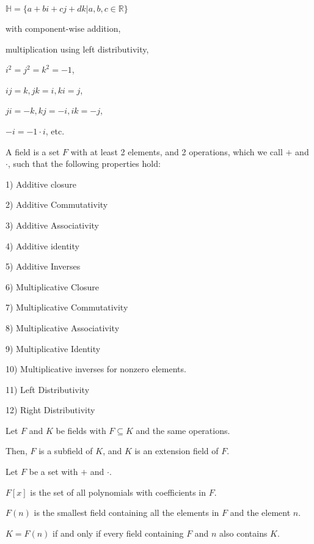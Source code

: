 \documentclass{article}
\newcommand{\R}{\mathbb R}
\newcommand{\quat}{\mathbb H}
\begin{document}

    $\quat = \{a + bi + cj + dk | a,b,c \in\R\}$
    
    with component-wise addition,
    
    multiplication using left distributivity,
    
    $i^2 = j^2 = k^2 = -1$,
    
    $ij = k, jk = i, ki = j$,
    
    $ji = -k, kj = -i, ik = -j$,
    
    $-i = -1 \cdot i$, etc.
    

    A field is a set $F$ with at least 2 elements, and 2 operations, which we call $+$ and $\cdot$, such that the following properties hold:
    
    1) Additive closure
    
    2) Additive Commutativity
    
    3) Additive Associativity
    
    4) Additive identity
    
    5) Additive Inverses
    
    6) Multiplicative Closure
    
    7) Multiplicative Commutativity
    
    8) Multiplicative Associativity
    
    9) Multiplicative Identity
    
    10) Multiplicative inverses for nonzero elements.
    
    11) Left Distributivity
    
    12) Right Distributivity
    

    Let $F$ and $K$ be fields with $F \subseteq K$ and the same operations.
    
    Then, $F$ is a subfield of $K$, and $K$ is an extension field of $F$.


    Let $F$ be a set with $+$ and $\cdot$.
    
    $F[x]$ is the set of all polynomials with coefficients in $F$.
    

    $F(n)$ is the smallest field containing all the elements in $F$ and the element $n$.
    
    $K = F(n)$ if and only if every field containing $F$ and $n$ also contains $K$.
\end{document}
